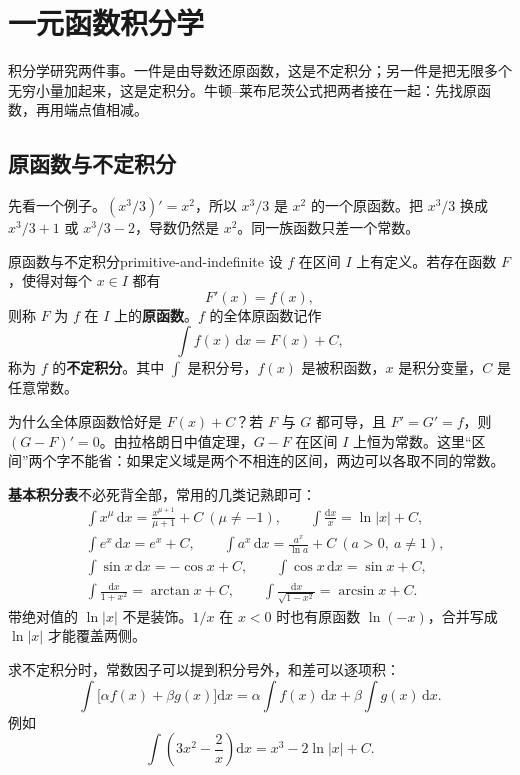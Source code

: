 \section{一元函数积分学}

积分学研究两件事。一件是由导数还原函数，这是不定积分；另一件是把无限多个无穷小量加起来，这是定积分。牛顿--莱布尼茨公式把两者接在一起：先找原函数，再用端点值相减。

\subsection{原函数与不定积分}

先看一个例子。\((x^3/3)'=x^2\)，所以 \(x^3/3\) 是 \(x^2\) 的一个原函数。把 \(x^3/3\) 换成 \(x^3/3+1\) 或 \(x^3/3-2\)，导数仍然是 \(x^2\)。同一族函数只差一个常数。

\begin{mydef}{原函数与不定积分}{primitive-and-indefinite}
设 \(f\) 在区间 \(I\) 上有定义。若存在函数 \(F\)，使得对每个 \(x\in I\) 都有
\[
  F'(x)=f(x),
\]
则称 \(F\) 为 \(f\) 在 \(I\) 上的\textbf{原函数}。\(f\) 的全体原函数记作
\[
  \int f(x)\,\mathrm{d}x=F(x)+C,
\]
称为 \(f\) 的\textbf{不定积分}。其中 \(\int\) 是积分号，\(f(x)\) 是被积函数，\(x\) 是积分变量，\(C\) 是任意常数。
\end{mydef}

为什么全体原函数恰好是 \(F(x)+C\)？若 \(F\) 与 \(G\) 都可导，且 \(F'=G'=f\)，则 \((G-F)'=0\)。由拉格朗日中值定理，\(G-F\) 在区间 \(I\) 上恒为常数。这里“区间”两个字不能省：如果定义域是两个不相连的区间，两边可以各取不同的常数。

\noindent\textbf{基本积分表}不必死背全部，常用的几类记熟即可：
\[
\begin{aligned}
&\int x^\mu\,\mathrm{d}x=\frac{x^{\mu+1}}{\mu+1}+C\ (\mu\ne-1),\qquad
\int \frac{\mathrm{d}x}{x}=\ln|x|+C,\\
&\int e^x\,\mathrm{d}x=e^x+C,\qquad
\int a^x\,\mathrm{d}x=\frac{a^x}{\ln a}+C\ (a>0,\ a\ne1),\\
&\int \sin x\,\mathrm{d}x=-\cos x+C,\qquad
\int \cos x\,\mathrm{d}x=\sin x+C,\\
&\int \frac{\mathrm{d}x}{1+x^2}=\arctan x+C,\qquad
\int \frac{\mathrm{d}x}{\sqrt{1-x^2}}=\arcsin x+C.
\end{aligned}
\]
带绝对值的 \(\ln|x|\) 不是装饰。\(1/x\) 在 \(x<0\) 时也有原函数 \(\ln(-x)\)，合并写成 \(\ln|x|\) 才能覆盖两侧。

求不定积分时，常数因子可以提到积分号外，和差可以逐项积：
\[
  \int\bigl[\alpha f(x)+\beta g(x)\bigr]\mathrm{d}x
  =\alpha\int f(x)\,\mathrm{d}x+\beta\int g(x)\,\mathrm{d}x .
\]
例如
\[
  \int\left(3x^2-\frac{2}{x}\right)\mathrm{d}x=x^3-2\ln|x|+C.
\]

